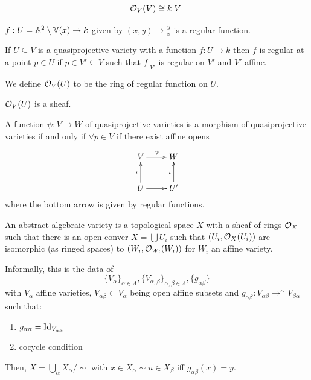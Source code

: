 \documentclass[12pt]{amsart}
\begin{document}
\begin{theorem}
    \[ \mathcal{O}_V(V) \cong k[V] \]
\end{theorem}

\begin{example}
    $f: U = \mathbb A^2 \setminus \mathbb V(x) \to k$ given by $(x,y) \to \frac{y}{x}$ is a regular function. 
\end{example}

\begin{definition}
    If $U \subseteq V$ is a quasiprojective variety with a function $f: U \to k$ then $f$ is regular at a point $p \in U$ if $p \in V' \subseteq V$ such that $f|_{V'}$ is regular on $V'$ and $V'$ affine. 
\end{definition}

\begin{definition}
    We define $\mathcal{O}_V(U)$ to be the ring of regular function on $U$. 
\end{definition}

\begin{lemma}
    $\mathcal{O}_V(U)$ is a sheaf. 
\end{lemma}

\begin{definition}
    A function $\psi: V \to W$ of quasiprojective varieties is a morphism of quasiprojective varieties if and only if $\forall p \in V$ if there exist affine opens 
    \[ \xymatrix{ V \ar[r]^\psi & W \\ U \ar[u]^\iota \ar[r] & U' \ar[u]^\iota }\]
    where the bottom arrow is given by regular functions. 
\end{definition}

\begin{definition}
    An abstract algebraic variety is a topological space $X$ with a sheaf of rings $\mathcal{O}_X$ such that there is an open conver $X = \bigcup U_i$ such that $(U_i, \mathcal{O}_X(U_i))$ are isomorphic (as ringed spaces) to $(W_i, \mathcal{O}_{W_i}(W_i))$ for $W_i$ an affine variety. 
\end{definition}

\begin{remark}
    Informally, this is the data of
    \[ \{V_\alpha\}_{\alpha \in \Lambda}, \{V_{\alpha, \beta}\}_{\alpha, \beta \in \Lambda}, \{g_{\alpha\beta}\}\]
    with $V_\alpha$ affine varieties, $V_{\alpha\beta} \subset V_\alpha$ being open affine subsets and $g_{\alpha\beta}: V_{\alpha\beta} \to^\sim V_{\beta\alpha}$ such that: 
    \begin{enumerate}
        \item $g_{\alpha\alpha} = \operatorname{Id}_{V_{\alpha\alpha}}$
        \item cocycle condition 
    \end{enumerate}
    Then, $X = \bigcup_{\alpha} X_\alpha / \sim$ with $x \in X_\alpha \sim u \in X_\beta$ iff $g_{\alpha\beta}(x) = y$. 
\end{remark}
\end{document}
